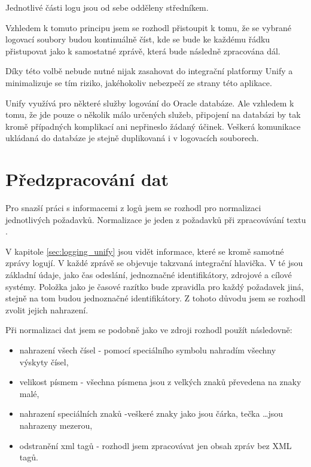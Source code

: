 \documentclass[thesis=M,czech]{FITthesis}[2012/10/20]
\begin{document}
		Jednotlivé části logu jsou od sebe odděleny středníkem.
		
		Vzhledem k tomuto principu jsem se rozhodl přistoupit k tomu, že se vybrané logovací soubory budou kontinuálně číst, kde se bude ke každému řádku přistupovat jako k samostatné zprávě, která bude následně zpracována dál.
		
		Díky této volbě nebude nutné nijak zasahovat do integrační platformy Unify a minimalizuje se tím riziko, jakéhokoliv nebezpečí ze strany této aplikace.
		
		Unify využívá pro některé služby logování do Oracle databáze. Ale vzhledem k tomu, že jde pouze o několik málo určených služeb, připojení na databázi by tak kromě případných komplikací ani nepřineslo žádaný účinek. Veškerá komunikace ukládaná do databáze je stejně duplikovaná i v logovacích souborech.
					
	\section{Předzpracování dat}
		\label{sec:preprocessing}
		
		Pro snazší práci s informacemi z logů jsem se rozhodl pro normalizaci jednotlivých požadavků. Normalizace je jeden z požadavků při zpracovávání textu \cite{txtNrmlztn}.
		
		V kapitole \ref{sec:logging_unify} jsou vidět informace, které se kromě samotné zprávy logují. V každé zprávě se objevuje takzvaná integrační hlavička. V té jsou základní údaje, jako čas odeslání, jednoznačné identifikátory, zdrojové a cílové systémy. Položka jako je časové razítko bude zpravidla pro každý požadavek jiná, stejně na tom budou jednoznačné identifikátory. Z tohoto důvodu jsem se rozhodl zvolit jejich nahrazení.
		
		Při normalizaci dat jsem se podobně jako ve zdroji \cite{Li_2013} rozhodl použít následovně:
		
		\begin{itemize} 
			\item nahrazení všech čísel - pomocí speciálního symbolu \uv{\#} nahradím všechny výskyty čísel,
			\item velikost písmem - všechna písmena jsou z velkých znaků převedena na znaky malé,
			\item nahrazení speciálních znaků -veškeré znaky jako jsou čárka, tečka \ldots jsou nahrazeny mezerou,
			\item odstranění xml tagů - rozhodl jsem zpracovávat jen obsah zpráv bez XML tagů.	
		\end{itemize}
	
\end{document}
